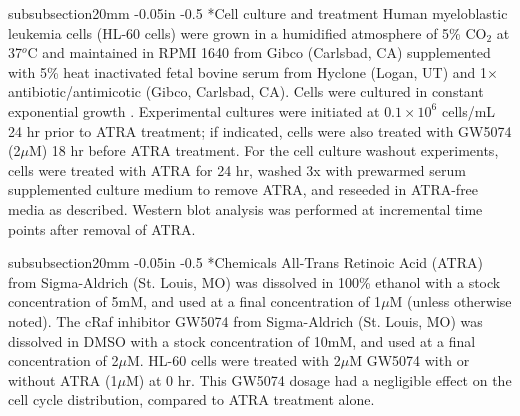 \documentclass[12pt]{article}
\makeatletter
\renewcommand\subsubsection{\@startsection
	{subsubsection}{2}{0mm}
	{-0.05in}
	{-0.5\baselineskip}
	{\normalfont\normalsize\itshape}}
\makeatother
\begin{document}

\subsubsection*{Cell culture and treatment}
Human myeloblastic leukemia cells (HL-60 cells) were grown in a humidified atmosphere of 5\% CO$_2$ at 37$^{o}$C and maintained in RPMI 1640 from Gibco (Carlsbad, CA)
supplemented with 5\% heat inactivated fetal bovine serum from Hyclone (Logan, UT) and 1$\times$ antibiotic/antimicotic (Gibco, Carlsbad, CA).
Cells were cultured in constant exponential growth \cite{Brooks1996}.
Experimental cultures were initiated at $0.1\times10^6$ cells/mL 24 hr prior to ATRA treatment;
if indicated, cells were also treated with GW5074 (2$\mu$M) 18 hr before ATRA treatment.
For the cell culture washout experiments, cells were treated with ATRA for 24 hr,
washed 3x with prewarmed serum supplemented culture medium to remove ATRA,
and reseeded in ATRA-free media as described.
Western blot analysis was performed at incremental time points after removal of ATRA.

\subsubsection*{Chemicals}
All-Trans Retinoic Acid (ATRA) from Sigma-Aldrich (St. Louis, MO) was dissolved in
100\% ethanol with a stock concentration of 5mM, and used at a final concentration of 1$\mu$M (unless otherwise noted).
The cRaf inhibitor GW5074 from Sigma-Aldrich (St. Louis, MO) was dissolved in DMSO with a stock concentration of 10mM,
and used at a final concentration of 2$\mu$M.
HL-60 cells were treated with 2$\mu$M GW5074 with or without ATRA (1$\mu$M) at 0 hr.
This GW5074 dosage had a negligible effect on the cell cycle distribution, compared to ATRA treatment alone.
\end{document}
